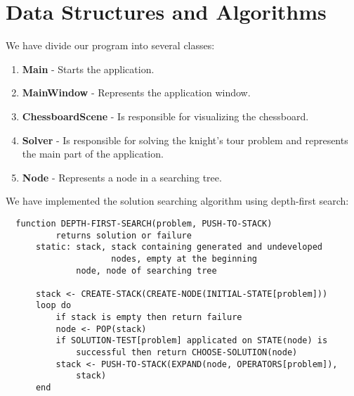 \newpage

\section{Data Structures and Algorithms}

We have divide our program into several classes:

\begin{enumerate}
\item \textbf{Main} - Starts the application.
\item \textbf{MainWindow} - Represents the application window.
\item \textbf{ChessboardScene} - Is responsible for visualizing the chessboard.
\item \textbf{Solver} - Is responsible for solving the knight's tour problem and represents the main part of the application.
\item \textbf{Node} - Represents a node in a searching tree.
\end{enumerate}

We have implemented the solution searching algorithm using depth-first search:\cite{UI}

\begingroup
\fontsize{10}{10}
\begin{verbatim}
  function DEPTH-FIRST-SEARCH(problem, PUSH-TO-STACK)
          returns solution or failure
      static: stack, stack containing generated and undeveloped
                     nodes, empty at the beginning
              node, node of searching tree

      stack <- CREATE-STACK(CREATE-NODE(INITIAL-STATE[problem]))
      loop do
          if stack is empty then return failure
          node <- POP(stack)
          if SOLUTION-TEST[problem] applicated on STATE(node) is
              successful then return CHOOSE-SOLUTION(node)
          stack <- PUSH-TO-STACK(EXPAND(node, OPERATORS[problem]),
              stack)
      end
\end{verbatim}
\endgroup
